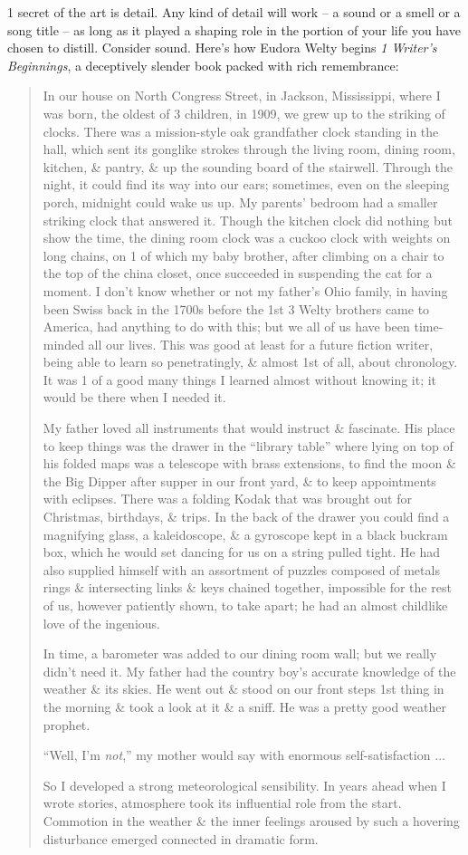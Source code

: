 \documentclass{article}
\begin{document}
1 secret of the art is detail. Any kind of detail will work -- a sound or a smell or a song title -- as long as it played a shaping role in the portion of your life you have chosen to distill. Consider sound. Here's how Eudora Welty begins \textit{1 Writer's Beginnings}, a deceptively slender book packed with rich remembrance:
\begin{quotation}
	In our house on North Congress Street, in Jackson, Mississippi, where I was born, the oldest of 3 children, in 1909, we grew up to the striking of clocks. There was a mission-style oak grandfather clock standing in the hall, which sent its gonglike strokes through the living room, dining room, kitchen, \& pantry, \& up the sounding board of the stairwell. Through the night, it could find its way into our ears; sometimes, even on the sleeping porch, midnight could wake us up. My parents' bedroom had a smaller striking clock that answered it. Though the kitchen clock did nothing but show the time, the dining room clock was a cuckoo clock with weights on long chains, on 1 of which my baby brother, after climbing on a chair to the top of the china closet, once succeeded in suspending the cat for a moment. I don't know whether or not my father's Ohio family, in having been Swiss back in the 1700s before the 1st 3 Welty brothers came to America, had anything to do with this; but we all of us have been time-minded all our lives. This was good at least for a future fiction writer, being able to learn so penetratingly, \& almost 1st of all, about chronology. It was 1 of a good many things I learned almost without knowing it; it would be there when I needed it.
	
	My father loved all instruments that would instruct \& fascinate. His place to keep things was the drawer in the ``library table'' where lying on top of his folded maps was a telescope with brass extensions, to find the moon \& the Big Dipper after supper in our front yard, \& to keep appointments with eclipses. There was a folding Kodak that was brought out for Christmas, birthdays, \& trips. In the back of the drawer you could find a magnifying glass, a kaleidoscope, \& a gyroscope kept in a black buckram box, which he would set dancing for us on a string pulled tight. He had also supplied himself with an assortment of puzzles composed of metals rings \& intersecting links \& keys chained together, impossible for the rest of us, however patiently shown, to take apart; he had an almost childlike love of the ingenious.
	
	In time, a barometer was added to our dining room wall; but we really didn't need it. My father had the country boy's accurate knowledge of the weather \& its skies. He went out \& stood on our front steps 1st thing in the morning \& took a look at it \& a sniff. He was a pretty good weather prophet.
	
	``Well, I'm \textit{not},'' my mother would say with enormous self-satisfaction $\ldots$
	
	So I developed a strong meteorological sensibility. In years ahead when I wrote stories, atmosphere took its influential role from the start. Commotion in the weather \& the inner feelings aroused by such a hovering disturbance emerged connected in dramatic form.
\end{quotation}
\end{document}
